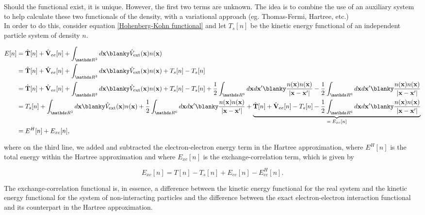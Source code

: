 \documentclass{homework}
\begin{document}
Should the functional exist, it is unique. However, the first two terms are unknown. The idea is to combine the use of an auxiliary system to help calculate these two functionals of the density, with a variational approach (eg. Thomas-Fermi, Hartree, etc.) \\

In order to do this, consider equation \eqref{Hohenberg-Kohn functional} and let $T_s[n]$ be the kinetic energy functional of an independent particle system of density $n$. 

\begin{align*}
     E[n] &= \hat{\bf T}[n] + \hat{\bf V}_{ee}[n] + \int_{\R^3} d{\bf x} \blanky \hat{V}_{\textnormal{ext}}({\bf x}) n({\bf x}) \\
     &= \hat{\bf T}[n] + \hat{\bf V}_{ee}[n] + \int_{\R^3} d{\bf x} \blanky \hat{V}_{\textnormal{ext}}({\bf x}) n({\bf x}) + T_s[n]-T_s[n] \\
     &= \hat{\bf T}[n] + \hat{\bf V}_{ee}[n] + \int_{\R^3} d{\bf x} \blanky \hat{V}_{\textnormal{ext}}({\bf x}) n({\bf x}) + T_s[n]-T_s[n] + \frac{1}{2} \int_{\R^6} d{\bf x} d{\bf x'} \blanky \frac{n({\bf x})n({\bf x})}{|{\bf x}-{\bf x'}|} - \frac{1}{2} \int_{\R^6} d{\bf x} d{\bf x'} \blanky \frac{n({\bf x})n({\bf x})}{|{\bf x}-{\bf x'}|} \\
     &= T_s[n] + \int_{\R^3} d{\bf x} \blanky \hat{V}_{\textnormal{ext}}({\bf x}) n({\bf x}) + \frac{1}{2} \int_{\R^6} d{\bf x} d{\bf x'} \blanky \frac{n({\bf x})n({\bf x})}{|{\bf x}-{\bf x'}|} + \underbrace{\hat{\bf T}[n] + \hat{\bf V}_{ee}[n] - T_s[n] - \frac{1}{2} \int_{\R^6} d{\bf x} d{\bf x'} \blanky \frac{n({\bf x})n({\bf x})}{|{\bf x}-{\bf x'}|}}_{\text{$=E_{xc}[n]$}} \\
     &= E^H [n] + E_{xc}[n],
\end{align*}

where on the third line, we added and subtracted the electron-electron energy term in the Hartree approximation, where $E^H[n]$ is the total energy within the Hartree approximation and where $ E_{xc}[n]$ is the exchange-correlation term, which is given by

$$
 E_{xc}[n] = T[n] - T_s[n] + E_{ee}[n] - E^H_{ee} [n].
$$

The exchange-correlation functional is, in essence, a difference between the kinetic energy functional for the real system and the kinetic energy functional for the system of non-interacting particles and the difference between the exact electron-electron interaction functional and its counterpart in the Hartree approximation. \\
\end{document}
